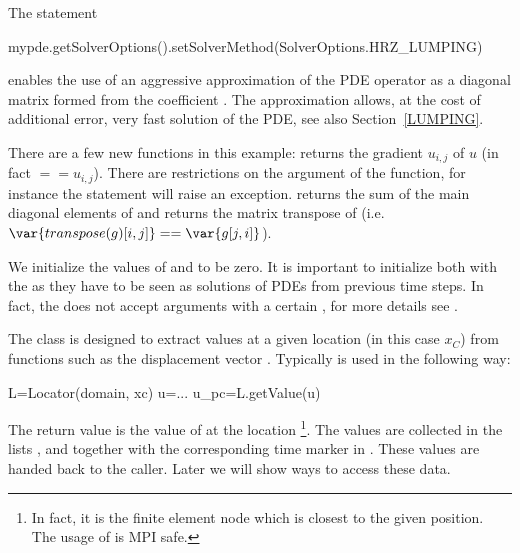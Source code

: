 The statement
\begin{python}
  mypde.getSolverOptions().setSolverMethod(SolverOptions.HRZ_LUMPING) 
\end{python}
enables the use of an aggressive approximation of the PDE operator as a
diagonal matrix formed from the coefficient .
The approximation allows, at the cost of additional error, very fast solution
of the PDE, see also Section~\ref{LUMPING}.

There are a few new \escript functions in this example: 
 returns the gradient $u_{i,j}$ of $u$ (in fact $==u_{i,j}$).
There are restrictions on the argument of the  function, for
instance the statement  will raise an exception.
 returns the sum of the main diagonal elements  of
 and  returns the matrix transpose of  (i.e.
$\var{transpose(g)[i,j]}==\var{g[j,i]}$). 

We initialize the values of  and  to be zero.
It is important to initialize both with the \SolutionFS as they have to be
seen as solutions of PDEs from previous time steps.
In fact, the  does not accept arguments with a certain
\FunctionSpace, for more details see . 

The  class is designed to extract values at a given location
(in this case $x_C$) from functions such as the displacement vector .
Typically  is used in the following way:
\begin{python}
  L=Locator(domain, xc)
  u=...
  u_pc=L.getValue(u)
\end{python}
The return value  is the value of  at the location
\footnote{In fact, it is the finite element node which is closest to
the given position. The usage of  is MPI safe.}.
The values are collected in the lists ,  and 
together with the corresponding time marker in .
These values are handed back to the caller. Later we will show ways to access these data.

